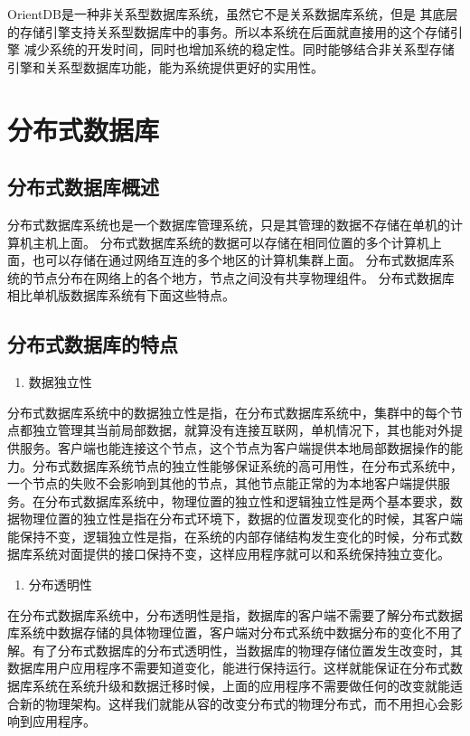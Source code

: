 OrientDB是一种非关系型数据库系统，虽然它不是关系数据库系统，但是
其底层的存储引擎支持关系型数据库中的事务。所以本系统在后面就直接用的这个存储引擎
减少系统的开发时间，同时也增加系统的稳定性。同时能够结合非关系型存储引擎和关系型数据库功能，能为系统提供更好的实用性。
\section{分布式数据库}
\subsection{分布式数据库概述}
分布式数据库系统也是一个数据库管理系统，只是其管理的数据不存储在单机的计算机主机上面。
分布式数据库系统的数据可以存储在相同位置的多个计算机上面，也可以存储在通过网络互连的多个地区的计算机集群上面。
分布式数据库系统的节点分布在网络上的各个地方，节点之间没有共享物理组件。
分布式数据库相比单机版数据库系统有下面这些特点。
\subsection{分布式数据库的特点}

	\begin{enumerate}
		\item 数据独立性
	\end{enumerate}

	分布式数据库系统中的数据独立性是指，在分布式数据库系统中，集群中的每个节点都独立管理其当前局部数据，就算没有连接互联网，单机情况下，其也能对外提供服务。客户端也能连接这个节点，这个节点为客户端提供本地局部数据操作的能力。分布式数据库系统节点的独立性能够保证系统的高可用性，在分布式系统中，一个节点的失败不会影响到其他的节点，其他节点能正常的为本地客户端提供服务。在分布式数据库系统中，物理位置的独立性和逻辑独立性是两个基本要求，数据物理位置的独立性是指在分布式环境下，数据的位置发现变化的时候，其客户端能保持不变，逻辑独立性是指，在系统的内部存储结构发生变化的时候，分布式数据库系统对面提供的接口保持不变，这样应用程序就可以和系统保持独立变化。
	

	\begin{enumerate}[resume]
		\item 分布透明性
	\end{enumerate}

	在分布式数据库系统中，分布透明性是指，数据库的客户端不需要了解分布式数据库系统中数据存储的具体物理位置，客户端对分布式系统中数据分布的变化不用了解。有了分布式数据库的分布式透明性，当数据库的物理存储位置发生改变时，其数据库用户应用程序不需要知道变化，能进行保持运行。这样就能保证在分布式数据库系统在系统升级和数据迁移时候，上面的应用程序不需要做任何的改变就能适合新的物理架构。这样我们就能从容的改变分布式的物理分布式，而不用担心会影响到应用程序。

